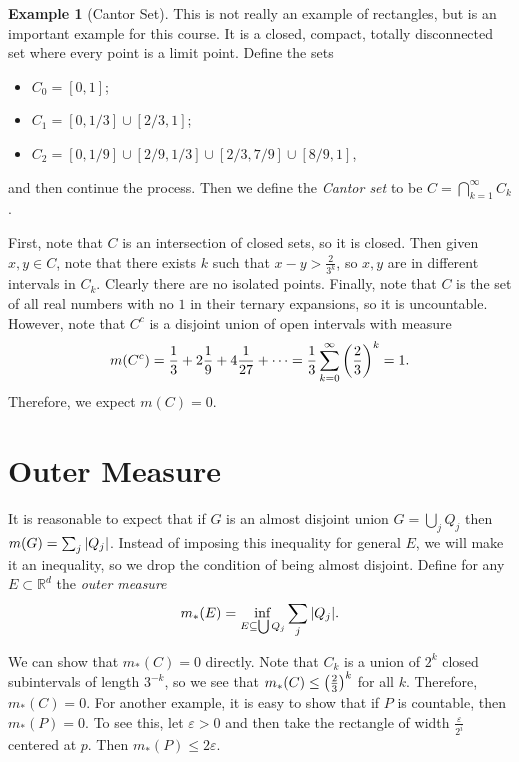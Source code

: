 \documentclass[leqno, openany]{memoir}
\theoremstyle{definition}
\newtheorem{exm}[thm]{Example}
\theoremstyle{remark}
\theoremstyle{plain}
\theoremstyle{definition}
\theoremstyle{remark}
\newcommand{\R}{\mathbb{R}}
\newcommand{\ep}{\varepsilon}
\begin{document}
\begin{exm}[Cantor Set] This is not really an example of rectangles, but is an
    important example for this course. It is a closed, compact, totally
    disconnected set where every point is a limit point. Define the sets
    \begin{itemize} \item $C_0 = [0,1]$; \item $C_1 = [0,1/3] \cup [2/3,1]$;
    \item $C_2 = [0,1/9] \cup [2/9,1/3] \cup [2/3, 7/9] \cup [8/9,1]$,
\end{itemize} and then continue the process. Then we define the \textit{Cantor
set} to be $C = \bigcap_{k=1}^{\infty} C_k$.

    First, note that $C$ is an intersection of closed sets, so it is closed.
    Then given $x,y \in C$, note that there exists $k$ such that $x-y >
    \frac{2}{3^k}$, so $x,y$ are in different intervals in $C_k$. Clearly there
    are no isolated points. Finally, note that $C$ is the set of all real
    numbers with no $1$ in their ternary expansions, so it is uncountable.
    However, note that $C^c$ is a disjoint union of open intervals with measure
    \[ m(C^c) = \frac{1}{3} + 2 \frac{1}{9} + 4 \frac{1}{27} + \cdots =
    \frac{1}{3} \sum_{k=0}^{\infty} \qty(\frac{2}{3})^k = 1. \] Therefore, we
expect $m(C) = 0$.  \end{exm}

\section{Outer Measure}%

It is reasonable to expect that if $G$ is an almost disjoint union $G =
\bigcup_j Q_j$ then $m(G) = \sum_j \abs{Q_j}$. Instead of imposing this
inequality for general $E$, we will make it an inequality, so we drop the
condition of being almost disjoint. Define for any $E \subset \R^d$ the
\textit{outer measure} \[ m_*(E) = \inf_{E \subseteq \bigcup Q_j} \sum_j
\abs{Q_j}. \]

We can show that $m_*(C) = 0$ directly. Note that $C_k$ is a union of $2^k$
closed subintervals of length $3^{-k}$, so we see that $m_*(C) \leq
\qty(\frac{2}{3})^k$ for all $k$. Therefore, $m_*(C) = 0$. For another example,
it is easy to show that if $P$ is countable, then $m_*(P) = 0$. To see this,
let $\ep > 0$ and then take the rectangle of width $\frac{\ep}{2^i}$ centered
at $p$. Then $m_*(P) \leq 2 \ep$.
\end{document}
